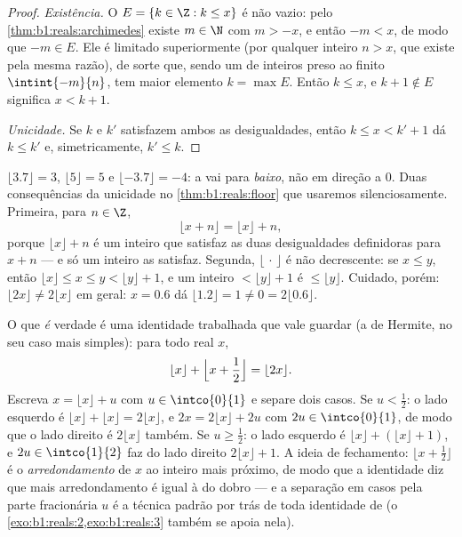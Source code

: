 \begin{proof}
\emph{Existência.} O  $E = \{k \in \Z : k \leq x\}$ é não vazio:
pelo \cref{thm:b1:reals:archimedes} existe $m \in \N$ com $m > -x$,
e então $-m < x$, de modo que $-m \in E$. Ele é limitado superiormente (por
qualquer inteiro $n > x$, que existe pela mesma razão), de sorte que,
sendo um  de inteiros preso ao  finito $\intint{-m}{n}$, tem
maior elemento $k = \max E$. Então $k \leq x$, e $k + 1 \notin E$
significa $x < k + 1$.

\emph{Unicidade.} Se $k$ e $k'$ satisfazem ambos as desigualdades,
então $k \leq x < k' + 1$ dá $k \leq k'$ e, simetricamente, $k'
\leq k$.
\end{proof}

\begin{example}\label{ex:b1:reals:floorpractice}
$\lfloor 3.7 \rfloor = 3$, $\lfloor 5 \rfloor = 5$ e $\lfloor
-3.7 \rfloor = -4$: a  vai para \emph{baixo}, não em direção a $0$.
Duas consequências da unicidade no \cref{thm:b1:reals:floor} que
usaremos silenciosamente. Primeira, para $n \in \Z$,
\[
\lfloor x + n \rfloor = \lfloor x \rfloor + n ,
\]
porque $\lfloor x \rfloor + n$ é um inteiro que satisfaz as duas
desigualdades definidoras para $x + n$ --- e só um inteiro as satisfaz.
Segunda, $\lfloor \, \cdot \, \rfloor$ é não decrescente: se $x \leq
y$, então $\lfloor x \rfloor \leq x \leq y < \lfloor y \rfloor + 1$,
e um inteiro $< \lfloor y \rfloor + 1$ é $\leq \lfloor y
\rfloor$. Cuidado, porém: $\lfloor 2x \rfloor \neq 2\lfloor
x \rfloor$ em geral: $x = 0.6$ dá $\lfloor 1.2 \rfloor = 1
\neq 0 = 2\lfloor 0.6 \rfloor$.

O que \emph{é} verdade é uma identidade trabalhada que vale guardar (a
de Hermite, no seu caso mais simples): para todo real $x$,
\[
\lfloor x \rfloor + \Bigl\lfloor x + \frac12 \Bigr\rfloor
= \lfloor 2x \rfloor .
\]
Escreva $x = \lfloor x\rfloor + u$ com $u \in \intco{0}{1}$ e
separe dois casos. Se $u < \frac12$: o lado esquerdo é $\lfloor
x\rfloor + \lfloor x\rfloor = 2\lfloor x\rfloor$, e $2x =
2\lfloor x\rfloor + 2u$ com $2u \in \intco{0}{1}$, de modo que o lado
direito é $2\lfloor x\rfloor$ também. Se $u \geq \frac12$: o lado
esquerdo é $\lfloor x\rfloor + (\lfloor x\rfloor + 1)$, e $2u \in
\intco{1}{2}$ faz do lado direito $2\lfloor x\rfloor + 1$. A
ideia de fechamento: $\lfloor x + \frac12\rfloor$ é o
\emph{arredondamento} de $x$ ao inteiro mais próximo, de modo que a
identidade diz que  mais arredondamento é igual à  do dobro --- e a separação em casos pela parte fracionária $u$ é
a técnica padrão por trás de toda identidade de 
(o \cref{exo:b1:reals:2,exo:b1:reals:3} também se apoia nela).
\end{example}

